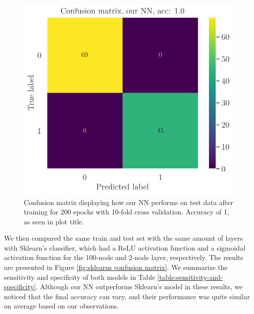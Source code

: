 \begin{figure}
    \centering
    \includegraphics[width=0.99\linewidth]{figures/ourWBC_final_ADAM_relu6-100_sigmoid-2.pdf}
    \caption{Confusion matrix displaying how our NN performs on test data after training for 200 epochs with 10-fold cross validation. Accuracy of 1, as seen in plot title.}
    \label{fig:our confusion matrix}
\end{figure}

We then compared the same train and test set with the same amount of layers with Sklearn's classifier, which had a ReLU activation function and a sigmoidal activation function for the 100-node and 2-node layer, respectively. The results are presented in Figure \ref{fig:sklearns confusion matrix}. We summarize the sensitivity and specificity of both models in Table \ref{table:sensitivity-and-specificity}. Although our NN outperforms Sklearn's model in these results, we noticed that the final accuracy can vary, and their performance was quite similar on average based on our observations. 

